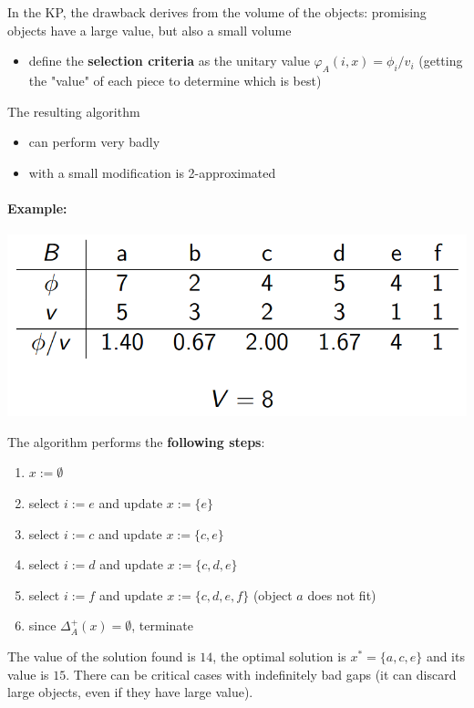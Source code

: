 \documentclass[11pt]{article}
\begin{document}
	In the KP, the drawback derives from the volume of the objects: promising objects have a large value, but also a small volume
	\begin{itemize}
		\item define the \textbf{selection criteria} as the unitary value $\varphi_A (i, x) = \phi_i / v_i$ (getting the "value" of each piece to determine which is best)
	\end{itemize}
	
	The resulting algorithm
	\begin{itemize}
		\item can perform very badly
		\item with a small modification is 2-approximated
	\end{itemize}
	
	\vfill
	
	\paragraph{Example:}
	\begin{center}
		\includegraphics[width=0.5\columnwidth]{img/HKP1}
	\end{center}
	The algorithm performs the \textbf{following steps}:
	\begin{enumerate}
		\item $x := \emptyset$
		\item select $i := e$ and update $x := \{e\}$
		\item select $i := c$ and update $x := \{c, e\}$
		\item select $i := d$ and update $x := \{c, d, e\}$
		\item select $i := f$ and update $x := \{c, d, e, f \}$ (object $a$ does not fit)
		\item since $\Delta_A^+ (x) = \emptyset$, terminate
	\end{enumerate}
	The value of the solution found is $14$, the optimal solution is $x^\ast = \{a, c, e\}$ and its value is $15$. There can be critical cases with indefinitely bad gaps (it can discard large objects, even if they have large value).
	
	\newpage
	
\end{document}

